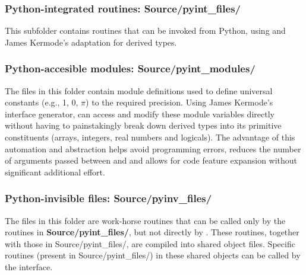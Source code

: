 \subsubsection{\textbf{Python-integrated routines: Source/pyint\_files/}}
This subfolder contains routines that can be invoked from Python, using  and James Kermode's  adaptation for derived types.

\subsubsection{\textbf{Python-accesible modules: Source/pyint\_modules/}}
The files in this folder contain module definitions used to define universal constants (e.g., 1, 0, $\pi$) to the required precision. Using James Kermode's  interface generator, \python \spc can access and modify these module variables directly without having to painstakingly break down derived types into its primitive constituents (arrays, integers, real numbers and logicals). The advantage of this automation and abstraction helps avoid programming errors, reduces the number of arguments passed between  and  and allows for code feature expansion without significant additional effort.

\subsubsection{\textbf{Python-invisible files: Source/pyinv\_files/}}
The files in this folder are work-horse routines that can be called only by the routines in \textbf{Source/pyint\_files/}, but not directly by \python. These routines, together with those in Source/pyint\_files/, are compiled into shared object files. Specific routines (present in Source/pyint\_files/) in these shared objects can be called by the \python \spc interface.